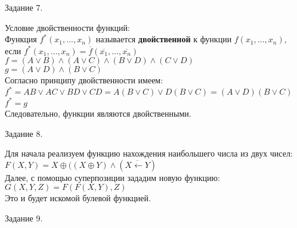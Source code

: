 \documentclass[a4paper,12pt]{report} %
\begin{document}
\bigskip

\begin{center}
	Задание 7.\\
\end{center}

\begin{flushleft}
	Условие двойственности функций:\\
	Функция $f^{*}(x_1, \ldots , x_n)$ называется \textbf{двойственной} к функции $f(x_1, \ldots , x_n)$,\\
	если $f^{*}(x_1, \ldots , x_n) = \overline{f}(\overline{x_1}, \ldots , \overline{x_n})$\\
	\bigskip
	$f=(A \vee B) \wedge (A \vee C) \wedge (B \vee D) \wedge (C \vee D)$\\
	$g= (A \vee D) \wedge (B \vee C)$\\
	Согласно принципу двойственности имеем:\\
	$f^{*}= AB \vee AC \vee BD \vee CD = A(B \vee C) \vee D(B \vee C) = (A\vee D)(B \vee C)$\\
	$f^{*} = g$\\
	Следовательно, функции являются двойственными.
\end{flushleft}

\bigskip

\begin{center}
	Задание 8.\\
\end{center}

\begin{flushleft}
	Для начала реализуем функцию нахождения наибольшего числа из двух чисел:\\
	$F(X,Y)=X \oplus ((X \oplus Y) \wedge (\overline{X \leftarrow Y}) $\\
	Далее, с помощью суперпозиции зададим новую функцию:\\
	$G(X,Y,Z) = F(F(X,Y),Z)$\\
	Это и будет искомой булевой функцией.
	
\end{flushleft}

\bigskip

\begin{center}
	Задание 9.\\
\end{center}
\end{document}
